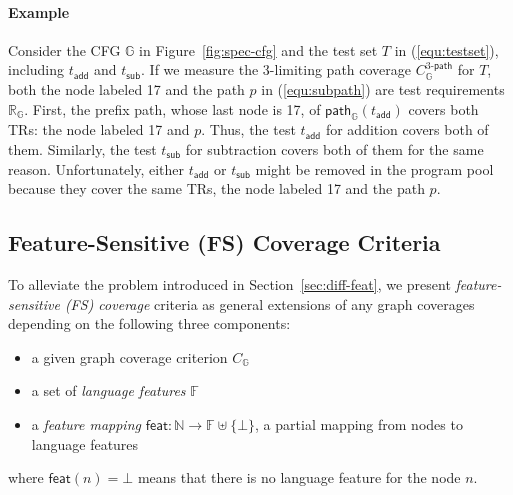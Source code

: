 \documentclass[acmsmall,review,screen]{acmart}
\newcommand{\name}[1]{\textsf{#1}}
\newcommand{\graph}{\mathbb{G}}
\newcommand{\nodeset}{\mathbb{N}}
\newcommand{\node}{n}
\newcommand{\pat}{p}
\newcommand{\patmap}[1]{\name{path}_{#1}}
\newcommand{\test}{t}
\newcommand{\addtest}{\test_\name{add}}
\newcommand{\subtest}{\test_\name{sub}}
\newcommand{\trset}[1]{\mathbb{R}_{#1}}
\newcommand{\cov}[1]{C_{#1}}
\newcommand{\kpathcov}[2]{\cov{#2}^{{#1}\name{-path}}}
\newcommand{\featset}{\mathbb{F}}
\newcommand{\featmap}{\name{feat}}
\begin{document}
\paragraph{\textbf{Example}}
%
Consider the CFG $\graph$ in Figure~\ref{fig:spec-cfg} and the test
set $T$ in (\ref{equ:testset}), including $\addtest$ and $\subtest$.
%
If we measure the 3-limiting path coverage $\kpathcov{3}{\graph}$ for
$T$, both the node labeled 17 and the path $\pat$ in (\ref{equ:subpath}) are
test requirements $\trset{\graph}$.
%
First, the prefix path, whose last node is 17, of $\patmap{\graph}(\addtest)$
covers both TRs: the node labeled 17 and $\pat$.
%
Thus, the test $\addtest$ for addition covers both of them.
%
Similarly, the test $\subtest$ for subtraction covers both of them for the same
reason.
%
Unfortunately, either $\addtest$ or $\subtest$ might be removed in the program
pool because they cover the same TRs, the node labeled 17 and the path $\pat$.




\subsection{Feature-Sensitive (FS) Coverage Criteria}\label{sec:fs-cov}

To alleviate the problem introduced in Section~\ref{sec:diff-feat}, we present
\textit{feature-sensitive (FS) coverage} criteria as general extensions of any
graph coverages depending on the following three components:
%
\begin{itemize}
  \item a given graph coverage criterion $\cov{\graph}$
  \item a set of \textit{language features} $\featset$
  \item a \textit{feature mapping} $\featmap: \nodeset \rightarrow \featset
    \uplus \{ \bot \}$, a partial mapping from nodes to language features
\end{itemize}
%
where $\featmap(\node) = \bot$ means that there is no language feature for the
node $\node$.

\end{document}
